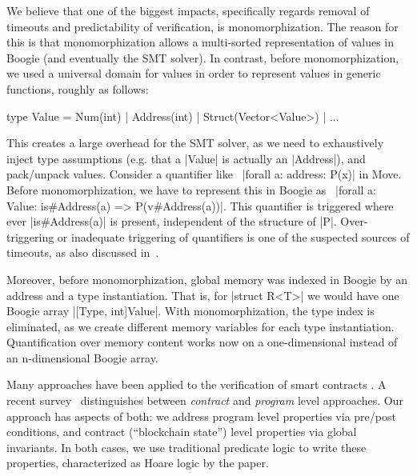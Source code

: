We believe that one of the biggest impacts, specifically regards
removal of timeouts and predictability of verification, is monomorphization. The
reason for this is that monomorphization allows a multi-sorted representation
of values in Boogie (and eventually the SMT solver). In contrast, before
monomorphization, we used a universal domain for values in order to represent
values in generic functions, roughly as follows:

\begin{Move}
  type Value = Num(int) | Address(int) | Struct(Vector<Value>) | ...
\end{Move}

\noindent This creates a large overhead for the SMT solver, as we need to
exhaustively inject type assumptions (e.g. that a |Value| is actually an
|Address|), and pack/unpack values. Consider a quantifier like~%
|forall a: address: P(x)| in Move. Before monomorphization, we have to represent
this in Boogie as~%
|forall a: Value: is#Address(a) => P(v#Address(a))|. This quantifier is
triggered where ever |is#Address(a)| is present, independent of the structure of
|P|. Over-triggering or inadequate triggering of quantifiers is one of the
suspected sources of timeouts, as also discussed in~\cite{BUTTERFLY}.

Moreover, before monomorphization, global memory was indexed in Boogie by an
address and a type instantiation. That is, for |struct R<T>| we would
have one Boogie array |[Type, int]Value|. With monomorphization, the type index
is eliminated, as we create different memory variables for each type
instantiation.  Quantification over memory content works now on a one-dimensional
instead of an n-dimensional Boogie array.


Many approaches have been applied to the verification of smart contracts
\cite{liu2019survey,miller2018smart,solcverify,DBLP:conf/esop/HajduJ20,verisol}.
A recent survey~\cite{CONTRACT_VERIFICATION} distinguishes between
\emph{contract} and \emph{program} level approaches. Our approach has aspects of
both: we address program level properties via pre/post conditions, and contract
(``blockchain state'') level properties via global invariants. In both cases, we
use traditional predicate logic to write these properties, characterized as
Hoare logic by the paper.

